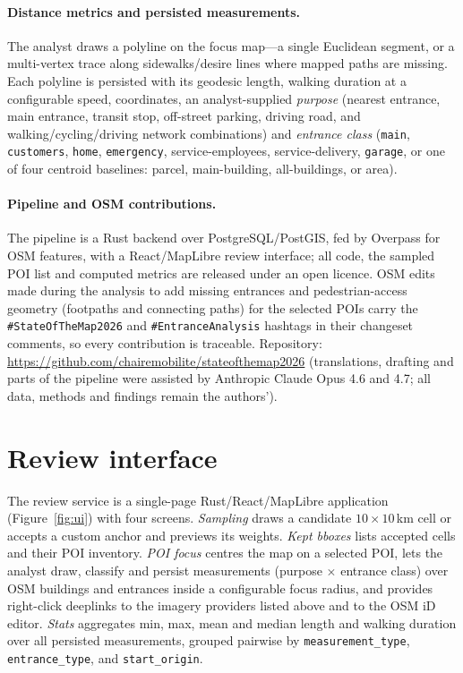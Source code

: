 \documentclass{article}
\begin{document}
\paragraph{Distance metrics and persisted measurements.} The
analyst draws a polyline on the focus map---a single Euclidean
segment, or a multi-vertex trace along sidewalks/desire lines
where mapped paths are missing. Each polyline is persisted with
its geodesic length, walking duration at a configurable speed,
coordinates, an analyst-supplied \emph{purpose} (nearest entrance,
main entrance, transit stop, off-street parking, driving road,
and walking/cycling/driving network combinations) and
\emph{entrance class} (\texttt{main}, \texttt{customers},
\texttt{home}, \texttt{emergency}, service-employees,
service-delivery, \texttt{garage}, or one of four centroid
baselines: parcel, main-building, all-buildings, or area).

\paragraph{Pipeline and OSM contributions.} The pipeline is a Rust
backend over PostgreSQL/PostGIS, fed by Overpass for OSM
features, with a React/MapLibre review interface; all code, the
sampled POI list and computed metrics are
released under an open licence. OSM edits made during the
analysis to add missing entrances and pedestrian-access
geometry (footpaths and connecting paths) for the selected POIs
carry the \texttt{\#StateOfTheMap2026} and
\texttt{\#EntranceAnalysis} hashtags in their changeset
comments, so every contribution is traceable. Repository:
\url{https://github.com/chairemobilite/stateofthemap2026}
(translations, drafting and parts of the pipeline were assisted by Anthropic
Claude Opus 4.6 and 4.7; all data, methods and
findings remain the authors').

\section{Review interface}

The review service is a single-page Rust/React/MapLibre
application (Figure~\ref{fig:ui}) with four screens. \emph{Sampling}
draws a candidate $10\times10$\,km cell or accepts a custom
anchor and previews its weights. \emph{Kept bboxes} lists
accepted cells and their POI inventory. \emph{POI focus} centres
the map on a selected POI, lets the analyst draw, classify and
persist measurements (purpose $\times$ entrance class) over OSM
buildings and entrances inside a configurable focus radius, and
provides right-click deeplinks to the imagery providers listed
above and to the OSM iD editor. \emph{Stats}
aggregates min, max, mean and median length and walking duration
over all persisted measurements, grouped pairwise by
\texttt{measurement\_type}, \texttt{entrance\_type}, and
\texttt{start\_origin}.
\end{document}
